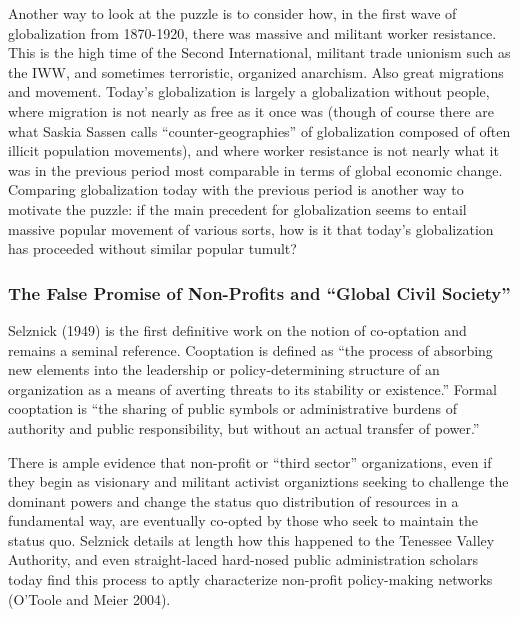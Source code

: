 \documentclass[12pt,book]{article}
\begin{document}
Another way to look at the puzzle is to consider how, in the first wave
of globalization from 1870-1920, there was massive and militant worker
resistance. This is the high time of the Second International, militant
trade unionism such as the IWW, and sometimes terroristic, organized
anarchism. Also great migrations and movement. Today's globalization is
largely a globalization without people, where migration is not nearly as
free as it once was (though of course there are what Saskia Sassen calls
``counter-geographies'' of globalization composed of often illicit
population movements), and where worker resistance is not nearly what it
was in the previous period most comparable in terms of global economic
change. Comparing globalization today with the previous period is
another way to motivate the puzzle: if the main precedent for
globalization seems to entail massive popular movement of various sorts,
how is it that today's globalization has proceeded without similar
popular tumult?

\subsubsection{The False Promise of Non-Profits and ``Global Civil
Society''}\label{the-false-promise-of-non-profits-and-global-civil-society}

Selznick (1949) is the first definitive work on the notion of
co-optation and remains a seminal reference. Cooptation is defined as
``the process of absorbing new elements into the leadership or
policy-determining structure of an organization as a means of averting
threats to its stability or existence.'' Formal cooptation is ``the
sharing of public symbols or administrative burdens of authority and
public responsibility, but without an actual transfer of power.''

There is ample evidence that non-profit or ``third sector''
organizations, even if they begin as visionary and militant activist
organiztions seeking to challenge the dominant powers and change the
status quo distribution of resources in a fundamental way, are
eventually co-opted by those who seek to maintain the status quo.
Selznick details at length how this happened to the Tenessee Valley
Authority, and even straight-laced hard-nosed public administration
scholars today find this process to aptly characterize non-profit
policy-making networks (O'Toole and Meier 2004).
\end{document}
